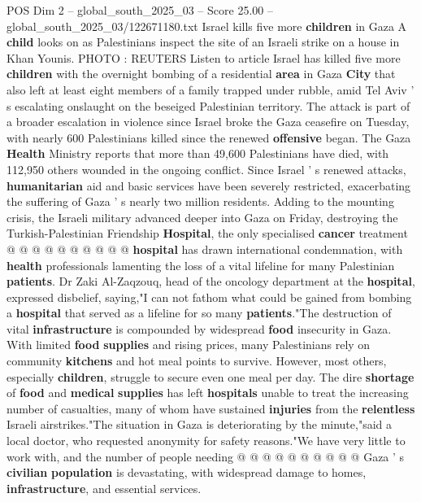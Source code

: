 \begin{textsample}{POS Dim 2 – global\_south\_2025\_03 – Score 25.00 – global\_south\_2025\_03/122671180.txt}  \label{ex:f2_pos_302}
Israel kills five more \textbf{children} in Gaza A \textbf{child} looks on as Palestinians inspect the site of an Israeli strike on a house in Khan Younis.
PHOTO : REUTERS Listen to article Israel has killed five more \textbf{children} with the overnight bombing of a residential \textbf{area} in Gaza \textbf{City} that also left at least eight members of a family trapped under rubble, amid Tel Aviv ' s escalating onslaught on the beseiged Palestinian territory.
The attack is part of a broader escalation in violence since Israel broke the Gaza ceasefire on Tuesday, with nearly 600 Palestinians killed since the renewed \textbf{offensive} began.
The Gaza \textbf{Health} Ministry reports that more than 49,600 Palestinians have died, with 112,950 others wounded in the ongoing conflict.
Since Israel ' s renewed attacks, \textbf{humanitarian} aid and basic services have been severely restricted, exacerbating the suffering of Gaza ' s nearly two million residents.
Adding to the mounting crisis, the Israeli military advanced deeper into Gaza on Friday, destroying the Turkish-Palestinian Friendship \textbf{Hospital}, the only specialised \textbf{cancer} treatment @ @ @ @ @ @ @ @ @ @ \textbf{hospital} has drawn international condemnation, with \textbf{health} professionals lamenting the loss of a vital lifeline for many Palestinian \textbf{patients}.
Dr Zaki Al-Zaqzouq, head of the oncology department at the \textbf{hospital}, expressed disbelief, saying,"I can not fathom what could be gained from bombing a \textbf{hospital} that served as a lifeline for so many \textbf{patients}."The destruction of vital \textbf{infrastructure} is compounded by widespread \textbf{food} insecurity in Gaza.
With limited \textbf{food} \textbf{supplies} and rising prices, many Palestinians rely on community \textbf{kitchens} and hot meal points to survive.
However, most others, especially \textbf{children}, struggle to secure even one meal per day.
The dire \textbf{shortage} of \textbf{food} and \textbf{medical} \textbf{supplies} has left \textbf{hospitals} unable to treat the increasing number of casualties, many of whom have sustained \textbf{injuries} from the \textbf{relentless} Israeli airstrikes."The situation in Gaza is deteriorating by the minute,"said a local doctor, who requested anonymity for safety reasons."We have very little to work with, and the number of people needing @ @ @ @ @ @ @ @ @ @ Gaza ' s \textbf{civilian} \textbf{population} is devastating, with widespread damage to homes, \textbf{infrastructure}, and essential services.

\end{textsample}
